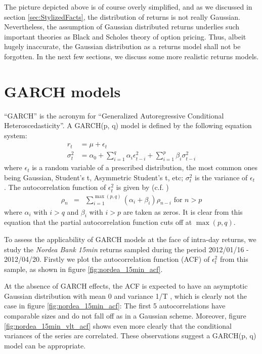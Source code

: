 The picture depicted above is of course overly simplified, and as we discussed in
section \ref{sec:StylizedFacts}, the distribution of returns is not really
Gaussian. Nevertheless, the assumption of Gaussian distributed returns
underlies such important theories as Black and Scholes theory of
option pricing. Thus, albeit hugely inaccurate, the Gaussian
distribution as a returns model shall not be forgotten. In the next
few sections, we discuss some more realistic returns models.

\section{GARCH models} \label{sec:Garch_model}
``GARCH'' is the acronym for ``Generalized Autoregressive Conditional
Heteroscedasticity''. A GARCH(p, q) model is defined by the following
equation system:
\begin{equation}
  \label{eq:garch_def}
  \begin{aligned}
    r_t &= \mu + \epsilon_t \\
    \sigma_t^2 &= \alpha_0 + \sum_{i=1}^q \alpha_i \epsilon_{t-i}^2 +
    \sum_{i=1}^p \beta_i \sigma_{t-i}^2
  \end{aligned}
\end{equation}
where $\epsilon_t$ is a random variable of a prescribed distribution,
the most common ones being Gaussian, Student's t, Asymmetric Student's
t, etc; $\sigma_t^2$ is the variance of $\epsilon_t$
\cite{Bollerslev86}. The autocorrelation function of $\epsilon_t^2$ is
given by (c.f. \cite{Bollerslev87})
\begin{eqnarray*}
\rho_n &=& \sum_{i=1} ^{\max(p, q)} (\alpha_i + \beta_i) \rho_{n-i}
\text{ for $n > p$}
\end{eqnarray*}
where $\alpha_i$ with $i > q$ and $\beta_i$ with $i > p$ are taken as
zeros. It is clear from this equation that the partial autocorrelation
function cuts off at $\max(p, q)$.

To assess the applicability of GARCH models at the face of intra-day
returns, we study the {\it Nordea Bank 15min} returns sampled during
the period 2012/01/16 - 2012/04/20. Firstly we plot the autocorrelation
function (ACF) of $\epsilon_t^2$ from this sample, as shown
in figure \ref{fig:nordea_15min_acf}.

At the absence of GARCH effects, the ACF is expected to have an
asymptotic Gaussian distribution with mean 0 and variance 1/T
\cite{Bollerslev86, Bollerslev87}, which is clearly not the case in
figure \ref{fig:nordea_15min_acf}: The first 5 autocorrelations have
comparable sizes and do not fall off as in a Gaussian
scheme. Moreover, figure \ref{fig:nordea_15min_vlt_acf} shows 
even more clearly that the conditional variances of the series are
correlated. These observations suggest a GARCH(p, q) model can be
appropriate.

